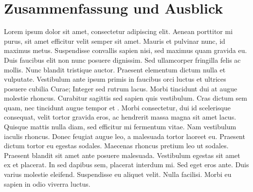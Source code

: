 
\chapter{Zusammenfassung und Ausblick}

Lorem ipsum dolor sit amet, consectetur adipiscing elit. Aenean porttitor mi purus, sit amet efficitur velit semper sit amet. Mauris et pulvinar nunc, id maximus metus. Suspendisse convallis sapien nisi, sed maximus quam gravida eu. Duis faucibus elit non nunc posuere dignissim. Sed ullamcorper fringilla felis ac mollis. Nunc blandit tristique auctor. Praesent elementum dictum nulla et vulputate. Vestibulum ante ipsum primis in faucibus orci luctus et ultrices posuere cubilia Curae; Integer sed rutrum lacus. Morbi tincidunt dui at augue molestie rhoncus. Curabitur sagittis sed sapien quis vestibulum. Cras dictum sem quam, nec tincidunt augue tempor et \cite{kauffels}. Morbi consectetur, dui id scelerisque consequat, velit tortor gravida eros, ac hendrerit massa magna sit amet lacus. Quisque mattis nulla diam, sed efficitur mi fermentum vitae. Nam vestibulum iaculis rhoncus.\newpar
Donec feugiat augue leo, a malesuada tortor laoreet eu. Praesent dictum tortor eu egestas sodales. Maecenas rhoncus pretium leo ut sodales. Praesent blandit sit amet ante posuere malesuada. Vestibulum egestas sit amet ex et placerat. In sed dapibus sem, placerat interdum mi. Sed eget eros ante. Duis varius molestie eleifend. Suspendisse eu aliquet velit. Nulla facilisi. Morbi eu sapien in odio viverra luctus.

\clearpage
